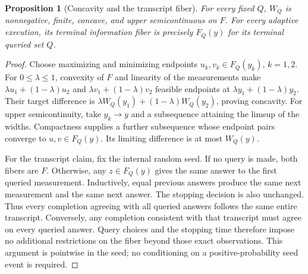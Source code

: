 \documentclass[12pt]{article}
\newtheorem{proposition}{Proposition}
\begin{document}
\begin{proposition}[Concavity and the transcript fiber]
\label{prop:risk_concavity_transcript}
For every fixed $Q$, $W_Q$ is nonnegative, finite, concave, and upper
semicontinuous on $F$. For every adaptive execution, its terminal
information fiber is precisely $F_Q(y)$ for its terminal queried set $Q$.
\end{proposition}
\begin{proof}
Choose maximizing and minimizing endpoints $u_k,v_k\in F_Q(y_k)$,
$k=1,2$. For $0\le\lambda\le1$, convexity of $F$ and linearity of the
measurements make $\lambda u_1+(1-\lambda)u_2$ and
$\lambda v_1+(1-\lambda)v_2$ feasible endpoints at
$\lambda y_1+(1-\lambda)y_2$. Their target difference is
$\lambda W_Q(y_1)+(1-\lambda)W_Q(y_2)$, proving concavity.
For upper semicontinuity, take $y_k\to y$ and a subsequence attaining
the limsup of the widths. Compactness supplies a further subsequence
whose endpoint pairs converge to $u,v\in F_Q(y)$. Its limiting
difference is at most $W_Q(y)$.

For the transcript claim, fix the internal random seed. If no query is
made, both fibers are $F$. Otherwise, any
$z\in F_Q(y)$ gives the same answer to the first queried measurement.
Inductively, equal previous answers produce the same next measurement
and the same next answer. The stopping decision is also unchanged.
Thus every completion agreeing with all queried answers follows the
same entire transcript. Conversely, any completion consistent with
that transcript must agree on every queried answer. Query choices and
the stopping time therefore impose no additional restrictions on the
fiber beyond those exact observations. This argument is pointwise in the
seed; no conditioning on a positive-probability seed event is required.
\end{proof}
\end{document}
